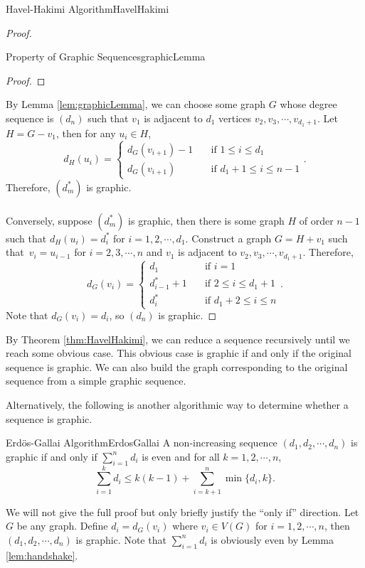\documentclass[math]{amznotes}
\theoremstyle{remark}
\begin{document}
\begin{thmbox}{Havel-Hakimi Algorithm}{HavelHakimi}
\begin{proof}
\begin{lembox}{Property of Graphic Sequences}{graphicLemma}
\begin{proof}
            \end{proof}
        \end{lembox}
        By Lemma \ref{lem:graphicLemma}, we can choose some graph $G$ whose degree sequence is $(d_n)$ such that $v_1$ is adjacent to $d_1$ vertices $v_2, v_3, \cdots, v_{d_1 + 1}$. Let $H = G - v_1$, then for any $u_i \in H$,
        \begin{equation*}
            d_H(u_i) = \begin{cases}
                d_G(v_{i + 1}) - 1 & \quad\textrm{if } 1 \leq i \leq d_1 \\
                d_G(v_{i + 1}) & \quad\textrm{if } d_1 + 1 \leq i \leq n - 1
            \end{cases}.
        \end{equation*}
        Therefore, $\left(d^*_m\right)$ is graphic.
        \\\\
        Conversely, suppose $\left(d^*_m\right)$ is graphic, then there is some graph $H$ of order $n - 1$ such that $d_H(u_i) = d^*_i$ for $i = 1, 2, \cdots, d_1$. Construct a graph $G = H + v_1$ such that~$v_i = u_{i - 1}$ for $i = 2, 3, \cdots, n$ and $v_1$ is adjacent to $v_2, v_3, \cdots, v_{d_1 + 1}$. Therefore,
        \begin{equation*}
            d_G(v_i) = \begin{cases}
                d_1 & \quad\textrm{if } i = 1 \\
                d^*_{i - 1} + 1 & \quad\textrm{if } 2 \leq i \leq d_1 + 1 \\
                d^*_{i} & \quad\textrm{if } d_1 + 2 \leq i \leq n
            \end{cases}.
        \end{equation*}
        Note that $d_G(v_i) = d_i$, so $(d_n)$ is graphic.
    \end{proof}
\end{thmbox}
By Theorem \ref{thm:HavelHakimi}, we can reduce a sequence recursively until we reach some obvious case. This obvious case is graphic if and only if the original sequence is graphic. We can also build the graph corresponding to the original sequence from a simple graphic sequence.

Alternatively, the following is another algorithmic way to determine whether a sequence is graphic.
\begin{thmbox}{Erd\"{o}s-Gallai Algorithm}{ErdosGallai}
    A non-increasing sequence $(d_1, d_2, \cdots, d_n)$ is graphic if and only if $\sum_{i = 1}^n d_i$ is even and for all $k = 1, 2, \cdots, n$,
    \begin{equation*}
        \sum_{i = 1}^{k} d_i \leq k(k - 1) + \sum_{i = k + 1}^{n}\min\{d_i, k\}.
    \end{equation*}
\end{thmbox}
We will not give the full proof but only briefly justify the ``only if'' direction. Let $G$ be any graph. Define $d_i = d_G(v_i)$ where $v_i \in V(G)$ for $i = 1, 2, \cdots, n$, then $(d_1, d_2, \cdots, d_n)$ is graphic. Note that $\sum_{i = 1}^{n}d_i$ is obviously even by Lemma \ref{lem:handshake}. 
\end{document}
